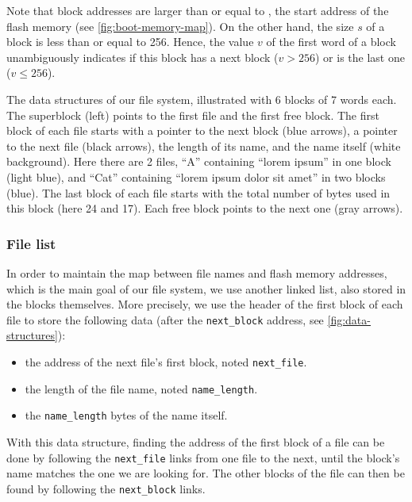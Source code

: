 Note that block addresses are larger than or equal to , the start
address of the flash memory (see \cref{fig:boot-memory-map}). On the other
hand, the size $s$ of a block is less than or equal to 256. Hence, the value
$v$ of the first word of a block unambiguously indicates if this block has a
next block ($v>256$) or is the last one ($v\le 256$).

\begin{Figure}
  

  \caption{The data structures of our file system, illustrated with 6 blocks of
  7 words each. The superblock (left) points to the first file and the first
  free block. The first block of each file starts with a pointer to the next
  block (blue arrows), a pointer to the next file (black arrows), the length of
  its name, and the name itself (white background). Here there are 2 files,
  ``A'' containing ``lorem ipsum'' in one block (light blue), and ``Cat''
  containing ``lorem ipsum dolor sit amet'' in two blocks (blue). The last
  block of each file starts with the total number of bytes used in this block
  (here 24 and 17). Each free block points to the next one (gray
  arrows).}\label{fig:data-structures}
\end{Figure}

\subsubsection{File list}

In order to maintain the map between file names and flash memory addresses,
which is the main goal of our file system, we use another linked list, also
stored in the blocks themselves. More precisely, we use the header of the first
block of each file to store the following data (after the {\tt next\_block}
address, see \cref{fig:data-structures}):
\begin{itemize}
  \item the address of the next file's first block, noted {\tt next\_file}.

  \item the length of the file name, noted {\tt name\_length}.

  \item the {\tt name\_length} bytes of the name itself.
\end{itemize}

With this data structure, finding the address of the first block of a file can
be done by following the {\tt next\_file} links from one file to the next,
until the block's name matches the one we are looking for. The other blocks of
the file can then be found by following the {\tt next\_block} links.

